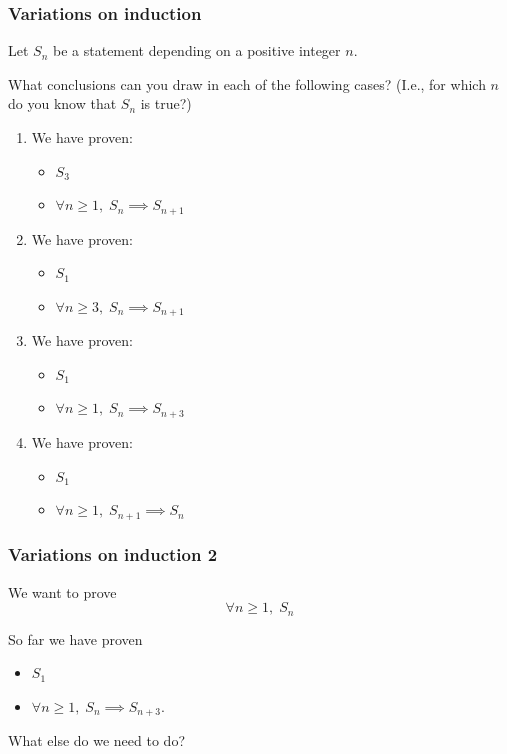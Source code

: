 \documentclass[14pt]{beamer}
\newcommand {\DS} [1] {${\displaystyle #1}$}
\begin{document}
\begin{frame}
\frametitle{Variations on induction}

Let $S_n$ be a statement depending on a positive integer $n$.

\vfill  

	What conclusions can you draw in each of the following cases? (I.e., for which $n$ do you
	know that $S_n$ is true?)

\vfill 

\begin{multicols}{2}
\begin{enumerate}
\item  We have proven:
	\begin{itemize}
		\item   $S_3$ 
		\item  \DS{\forall n \geq 1, \; S_{n}  \implies S_{n+1} }
	\end{itemize}	
\item  We have proven:
	\begin{itemize}
		\item  $S_1$ 
		\item  \DS{\forall n \geq 3, \; S_{n} \implies S_{n+1} }
	\end{itemize}	
\item  We have proven:
	\begin{itemize}
		\item  $S_1$ 
		\item  \DS{\forall n \geq 1, \; S_{n} \implies S_{n+3} }
	\end{itemize}	
\item  We have proven:
	\begin{itemize}
		\item  $S_1$ 
		\item  \DS{\forall n \geq 1, \; S_{n+1}  \implies S_{n} }
	\end{itemize}	
\end{enumerate}	
\end{multicols}

\vfill

\end{frame}


\begin{frame}
\frametitle{Variations on induction 2}

We want to prove  
	$$\forall n \geq 1, \; S_n $$
	
\vfill

So far we have proven
	\begin{itemize}
		\item  $S_1$ 
		\item  \DS{\forall n \geq 1, \; S_n \implies S_{n+3}.}
	\end{itemize}	

\vfill	

What else do we need to do?

\end{frame}
\end{document}
